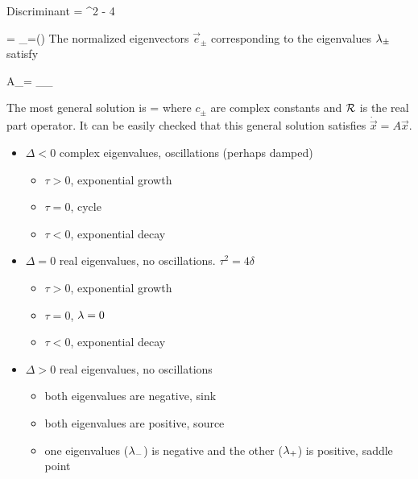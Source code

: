 Discriminant
\beq
\Delta = \tau^2 - 4 \delta
\eeq

\beq
\lam = \lam_\pm =(\tau\pm \sqrt{\Delta})
\eeq
The normalized eigenvectors $\vec{e}_\pm$ corresponding
to the eigenvalues $\lambda_\pm$ satisfy

\beq 
A_\pm = \lam_{\pm}_\pm
\eeq


The most general solution is
\beq
{} = \calr{}
\eeq
where $c_\pm$ are complex constants and ${\cal R}$
is the real part operator. It can be easily checked that
this general solution satisfies $\dot{\vec{x}} = A \vec{x}$.

\begin{itemize}
\item $\Delta < 0$
complex eigenvalues,
oscillations (perhaps damped)
\begin{itemize}
\item $\tau>0$, exponential growth
\item $\tau=0$, cycle
\item $\tau<0$, exponential decay
\end{itemize}


\item $\Delta = 0$
real eigenvalues,
no oscillations. $\tau^2 = 4\delta$
\begin{itemize}
\item $\tau>0$, exponential growth
\item $\tau=0$, $\lambda=0$
\item $\tau<0$, exponential decay
\end{itemize}

\item $\Delta > 0$
real eigenvalues,
no oscillations 

\begin{itemize}
\item both eigenvalues are negative, sink
\item both eigenvalues are positive, source
\item one eigenvalues ($\lambda_-$) is negative 
and the other ($\lambda_+$) is positive, saddle point
\end{itemize}
\end{itemize}

